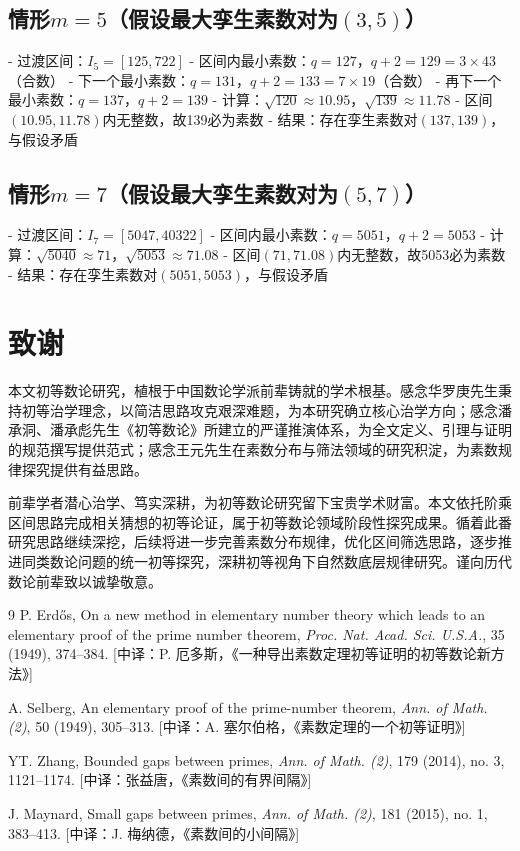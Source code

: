 \documentclass[12pt,a4paper,reqno]{amsart}
\theoremstyle{plain}
\theoremstyle{definition}
\theoremstyle{remark}
\begin{document}
	\subsection*{情形$m=5$（假设最大孪生素数对为$(3,5)$）}
	- 过渡区间：$I_5 = [125, 722]$
	- 区间内最小素数：$q=127$，$q+2=129=3 \times 43$（合数）
	- 下一个最小素数：$q=131$，$q+2=133=7 \times 19$（合数）
	- 再下一个最小素数：$q=137$，$q+2=139$
	- 计算：$\sqrt{120} \approx 10.95$，$\sqrt{139} \approx 11.78$
	- 区间$(10.95, 11.78)$内无整数，故139必为素数
	- 结果：存在孪生素数对$(137, 139)$，与假设矛盾
	
	\subsection*{情形$m=7$（假设最大孪生素数对为$(5,7)$）}
	- 过渡区间：$I_7 = [5047, 40322]$
	- 区间内最小素数：$q=5051$，$q+2=5053$
	- 计算：$\sqrt{5040} \approx 71$，$\sqrt{5053} \approx 71.08$
	- 区间$(71, 71.08)$内无整数，故5053必为素数
	- 结果：存在孪生素数对$(5051, 5053)$，与假设矛盾
	\section{致谢}
	本文初等数论研究，植根于中国数论学派前辈铸就的学术根基。感念华罗庚先生秉持初等治学理念，以简洁思路攻克艰深难题，为本研究确立核心治学方向；感念潘承洞、潘承彪先生《初等数论》所建立的严谨推演体系，为全文定义、引理与证明的规范撰写提供范式；感念王元先生在素数分布与筛法领域的研究积淀，为素数规律探究提供有益思路。
	
	前辈学者潜心治学、笃实深耕，为初等数论研究留下宝贵学术财富。本文依托阶乘区间思路完成相关猜想的初等论证，属于初等数论领域阶段性探究成果。循着此番研究思路继续深挖，后续将进一步完善素数分布规律，优化区间筛选思路，逐步推进同类数论问题的统一初等探究，深耕初等视角下自然数底层规律研究。谨向历代数论前辈致以诚挚敬意。
	\begin{thebibliography}{9}
		P. Erdős, On a new method in elementary number theory which leads to an elementary proof of the prime number theorem, \textit{Proc. Nat. Acad. Sci. U.S.A.}, 35 (1949), 374–384. [中译：P. 厄多斯，《一种导出素数定理初等证明的初等数论新方法》]
		
		A. Selberg, An elementary proof of the prime-number theorem, \textit{Ann. of Math. (2)}, 50 (1949), 305–313. [中译：A. 塞尔伯格，《素数定理的一个初等证明》]
		
		YT. Zhang, Bounded gaps between primes, \textit{Ann. of Math. (2)}, 179 (2014), no. 3, 1121–1174. [中译：张益唐，《素数间的有界间隔》]
		
		J. Maynard, Small gaps between primes, \textit{Ann. of Math. (2)}, 181 (2015), no. 1, 383–413. [中译：J. 梅纳德，《素数间的小间隔》]
	\end{thebibliography}
	
\end{document}
